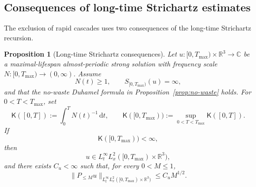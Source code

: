 \documentclass{interact}
\numberwithin{equation}{section}
\theoremstyle{plain}
\newtheorem{proposition}[theorem]{Proposition}
\theoremstyle{definition}
\theoremstyle{remark}
\newcommand{\R}{\mathbb R}
\newcommand{\C}{\mathbb C}
\newcommand{\dd}{\,\mathrm d}
\begin{document}
\subsection{Consequences of long-time Strichartz estimates}

The exclusion of rapid cascades uses two consequences of the long-time Strichartz recursion.

\begin{proposition}[Long-time Strichartz consequences]\label{prop:LTS}
Let $u:[0,T_{\max})\times\R^3\to\C$ be a maximal-lifespan almost-periodic strong solution with frequency scale $N:[0,T_{\max})\to(0,\infty)$. Assume
\[
 N(t)\ge1,
 \qquad
 S_{[0,T_{\max})}(u)=\infty,
\]
and that the no-waste Duhamel formula in Proposition~\ref{prop:no-waste} holds. For $0<T<T_{\max}$, set
\[
 \mathsf K([0,T]):=\int_0^T N(t)^{-1}\dd t,
 \qquad
 \mathsf K([0,T_{\max})):=\sup_{0<T<T_{\max}}\mathsf K([0,T]).
\]
If
\[
 \mathsf K([0,T_{\max}))<\infty,
\]
then
\begin{equation}\label{eq:LTS-mass-recovery}
 u\in L_t^\infty L_x^2([0,T_{\max})\times\R^3),
\end{equation}
and there exists $C_u<\infty$ such that, for every $0<M\le1$,
\begin{equation}\label{eq:absolute-low-mass}
 \|P_{\le M}u\|_{L_t^\infty L_x^2([0,T_{\max})\times\R^3)}
 \le C_uM^{1/2}.
\end{equation}
\end{proposition}
\end{document}
